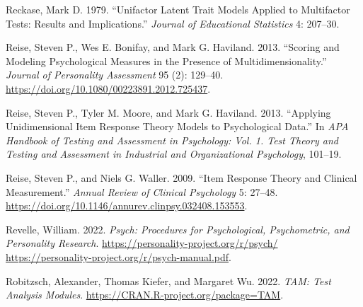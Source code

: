 \documentclass[
  letterpaper,
  DIV=11,
  numbers=noendperiod]{scrreport}
\newlength{\cslhangindent}
\newlength{\cslentryspacingunit} %
\newenvironment{CSLReferences}[2] %
 {%
  \setlength{\parindent}{0pt}
  \ifodd #1
  \let\oldpar\par
  \def\par{\hangindent=\cslhangindent\oldpar}
  \fi
  \setlength{\parskip}{#2\cslentryspacingunit}
 }%
 {}
\begin{document}
\begin{CSLReferences}{1}{0}
\leavevmode{}%
Reckase, Mark D. 1979. {``Unifactor Latent Trait Models Applied to
Multifactor Tests: Results and Implications.''} \emph{Journal of
Educational Statistics} 4: 207--30.

\leavevmode{}%
Reise, Steven P., Wes E. Bonifay, and Mark G. Haviland. 2013. {``Scoring
and Modeling Psychological Measures in the Presence of
Multidimensionality.''} \emph{Journal of Personality Assessment} 95 (2):
129--40. \url{https://doi.org/10.1080/00223891.2012.725437}.

\leavevmode{}%
Reise, Steven P., Tyler M. Moore, and Mark G. Haviland. 2013.
{``Applying Unidimensional Item Response Theory Models to Psychological
Data.''} In \emph{APA Handbook of Testing and Assessment in Psychology:
Vol. 1. Test Theory and Testing and Assessment in Industrial and
Organizational Psychology}, 101--19.

\leavevmode{}%
Reise, Steven P., and Niels G. Waller. 2009. {``Item Response Theory and
Clinical Measurement.''} \emph{Annual Review of Clinical Psychology} 5:
27--48. \url{https://doi.org/10.1146/annurev.clinpsy.032408.153553}.

\leavevmode{}%
Revelle, William. 2022. \emph{Psych: Procedures for Psychological,
Psychometric, and Personality Research}.
\href{https://personality-project.org/r/psych/\%0Ahttps://personality-project.org/r/psych-manual.pdf}{https://personality-project.org/r/psych/
https://personality-project.org/r/psych-manual.pdf}.

\leavevmode{}%
Robitzsch, Alexander, Thomas Kiefer, and Margaret Wu. 2022. \emph{TAM:
Test Analysis Modules}. \url{https://CRAN.R-project.org/package=TAM}.

\end{CSLReferences}
\end{document}
